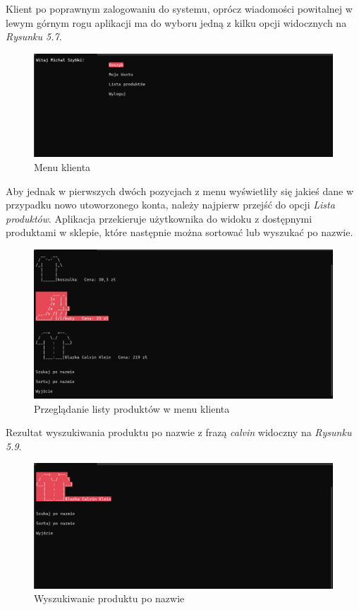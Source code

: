 Klient po poprawnym zalogowaniu do systemu, oprócz wiadomości powitalnej w lewym górnym rogu aplikacji ma do wyboru jedną z kilku opcji widocznych na \textit{Rysunku 5.7}. 

\begin{figure}[H]
	\centering
		\includegraphics[width=15cm]{screeny/klient_menu.png}
	\caption{\footnotesize Menu klienta}
	\label{fig:plotend}
\end{figure}

Aby jednak w pierwszych dwóch pozycjach z menu wyświetliły się jakieś dane w przypadku nowo utoworzonego konta, należy najpierw przejść do opcji \textit{Lista produktów}. Aplikacja przekieruje użytkownika do widoku z dostępnymi produktami w sklepie, które następnie można sortować lub wyszukać po nazwie. 

\begin{figure}[H]
	\centering
		\includegraphics[width=15cm]{screeny/sklep_klient.png}
	\caption{\footnotesize Przeglądanie listy produktów w menu klienta}
	\label{fig:plotend}
\end{figure}

Rezultat wyszukiwania produktu po nazwie z frazą \textit{calvin} widoczny na \textit{Rysunku 5.9}.
	
\begin{figure}[H]
	\centering
		\includegraphics[width=15cm]{screeny/szukaj.png}
	\caption{\footnotesize Wyszukiwanie produktu po nazwie}
	\label{fig:plotend}
\end{figure}

